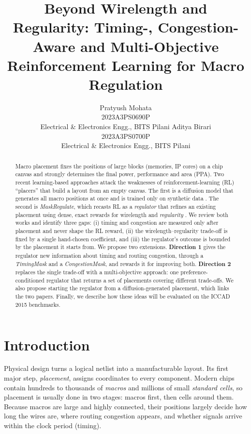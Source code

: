 \documentclass{article}
\title{Beyond Wirelength and Regularity: Timing-, Congestion-Aware and Multi-Objective Reinforcement Learning for Macro Regulation}
\author{{Pratyush Mohata} \\
	2023A3PS0690P\\
    Electrical \& Electronics Engg., BITS Pilani
	\And
    {Aditya Birari} \\
	2023A3PS0700P\\
    Electrical \& Electronics Engg., BITS Pilani
}
\begin{document}
\maketitle

\begin{abstract}
Macro placement fixes the positions of large blocks (memories, IP cores) on a chip canvas and strongly
determines the final power, performance and area (PPA). Two recent learning-based approaches attack the
weaknesses of reinforcement-learning (RL) ``placers'' that build a layout from an empty canvas. The
first is a diffusion model that generates all macro positions at once and is trained only on synthetic
data \citep{lee2025diffusion}. The second is \emph{MaskRegulate}, which recasts RL as a
\emph{regulator} that refines an existing placement using dense, exact rewards for wirelength and
\emph{regularity} \citep{xue2024maskregulate}. We review both works and identify three gaps:
(i) timing and congestion are measured only after placement and never shape the RL reward,
(ii) the wirelength--regularity trade-off is fixed by a single hand-chosen coefficient, and
(iii) the regulator's outcome is bounded by the placement it starts from. We propose two extensions.
\textbf{Direction 1} gives the regulator new information about timing and routing congestion, through
a \emph{TimingMask} and a \emph{CongestionMask}, and rewards it for improving both.
\textbf{Direction 2} replaces the single trade-off with a multi-objective approach: one
preference-conditioned regulator that returns a set of placements covering different trade-offs. We
also propose starting the regulator from a diffusion-generated placement, which links the two papers.
Finally, we describe how these ideas will be evaluated on the ICCAD 2015 benchmarks.
\end{abstract}


\section{Introduction}

Physical design turns a logical netlist into a manufacturable layout. Its first major step,
\emph{placement}, assigns coordinates to every component. Modern chips contain hundreds to thousands of
\emph{macros} and millions of small \emph{standard cells}, so placement is usually done in two stages:
macros first, then cells around them. Because macros are large and highly connected, their positions
largely decide how long the wires are, where routing congestion appears, and whether signals arrive
within the clock period (timing).
\end{document}
